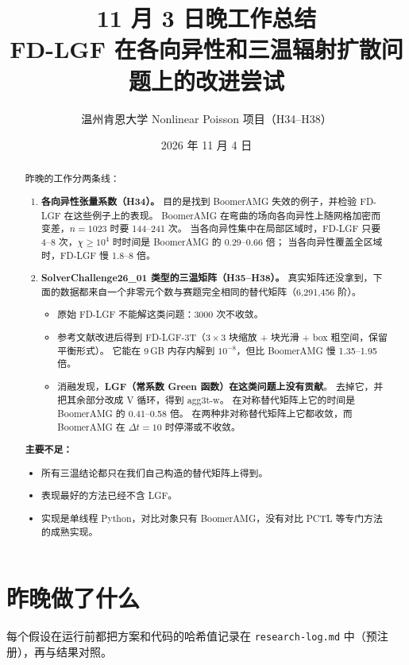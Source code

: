 \documentclass[11pt,a4paper]{ctexart}
\title{11 月 3 日晚工作总结\\FD-LGF 在各向异性和三温辐射扩散问题上的改进尝试}
\author{温州肯恩大学 \quad Nonlinear Poisson 项目（H34--H38）}
\date{2026 年 11 月 4 日}
\begin{document}
\maketitle

\begin{abstract}
\noindent 昨晚的工作分两条线：
\begin{enumerate}
\item \textbf{各向异性张量系数（H34）。}
目的是找到 BoomerAMG 失效的例子，并检验 FD-LGF 在这些例子上的表现。
BoomerAMG 在弯曲的场向各向异性上随网格加密而变差，$n=1023$ 时要 144--241 次。
当各向异性集中在局部区域时，FD-LGF 只要 4--8 次，$\chi\ge10^4$ 时时间是 BoomerAMG 的 0.29--0.66 倍；
当各向异性覆盖全区域时，FD-LGF 慢 1.8--8 倍。
\item \textbf{SolverChallenge26\_01 类型的三温矩阵（H35--H38）。}
真实矩阵还没拿到，下面的数据都来自一个非零元个数与赛题完全相同的替代矩阵（6,291,456 阶）。
\begin{itemize}
\item 原始 FD-LGF 不能解这类问题：3000 次不收敛。
\item 参考文献改进后得到 FD-LGF-3T（$3\times3$ 块缩放 + 块光滑 + box 粗空间，保留平衡形式）。
它能在 9\,GB 内存内解到 $10^{-8}$，但比 BoomerAMG 慢 1.35--1.95 倍。
\item 消融发现，\textbf{LGF（常系数 Green 函数）在这类问题上没有贡献}。
去掉它，并把其余部分改成 V 循环，得到 agg3t-w。
在对称替代矩阵上它的时间是 BoomerAMG 的 0.41--0.58 倍。
在两种非对称替代矩阵上它都收敛，而 BoomerAMG 在 $\Delta t=10$ 时停滞或不收敛。
\end{itemize}
\end{enumerate}
\textbf{主要不足：}
\begin{itemize}
\item 所有三温结论都只在我们自己构造的替代矩阵上得到。
\item 表现最好的方法已经不含 LGF。
\item 实现是单线程 Python，对比对象只有 BoomerAMG，没有对比 PCTL 等专门方法的成熟实现。
\end{itemize}
\end{abstract}

\section{昨晚做了什么}
每个假设在运行前都把方案和代码的哈希值记录在 \texttt{research-log.md} 中（预注册），再与结果对照。
\end{document}
